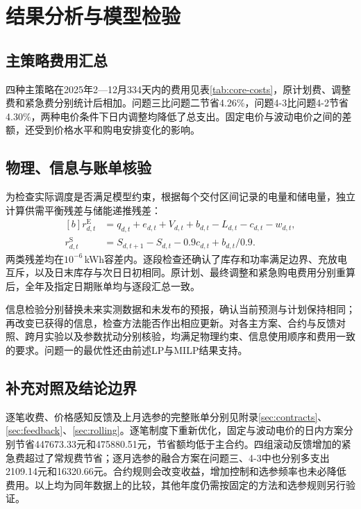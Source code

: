 \section{结果分析与模型检验}
\subsection{主策略费用汇总}
四种主策略在2025年2—12月334天内的费用见表\ref{tab:core-costs}，原计划费、调整费和紧急费分别统计后相加。问题三比问题二节省4.26\%，问题4-3比问题4-2节省4.30\%，两种电价条件下日内调整均降低了总支出。固定电价与波动电价之间的差额，还受到价格水平和购电安排变化的影响。

\FloatBarrier

\subsection{物理、信息与账单核验}
为检查实际调度是否满足模型约束，根据每个交付区间记录的电量和储电量，独立计算供需平衡残差与储能递推残差：
\begin{equation}
\begin{aligned}[b]
 r^{\mathrm E}_{d,t}&=q_{d,t}+e_{d,t}+V_{d,t}+b_{d,t}
                 -L_{d,t}-c_{d,t}-w_{d,t},\\
 r^{\mathrm S}_{d,t}&=S_{d,t+1}-S_{d,t}-0.9c_{d,t}+b_{d,t}/0.9.
\end{aligned}
\end{equation}
两类残差均在$10^{-6}$\,kWh容差内。逐段检查还确认了库存和功率满足边界、充放电互斥，以及日末库存与次日日初相同。原计划、最终调整和紧急购电费用分别重算后，全年及指定日期账单均与逐段汇总一致。

信息检验分别替换未来实测数据和未发布的预报，确认当前预测与计划保持相同；再改变已获得的信息，检查方法能否作出相应更新。对各主方案、合约与反馈对照、跨月实验以及参数扰动分别核验，均满足物理约束、信息使用顺序和费用一致的要求。问题一的最优性还由前述LP与MILP结果支持。

\subsection{补充对照及结论边界}
逐笔收费、价格感知反馈及上月选参的完整账单分别见附录\ref{sec:contracts}、\ref{sec:feedback}、\ref{sec:rolling}。逐笔制度下重新优化，固定与波动电价的日内方案分别节省447673.33元和475880.51元，节省额均低于主合约。四组滚动反馈增加的紧急费超过了常规费节省；逐月选参的融合方案在问题三、4-3中也分别多支出2109.14元和16320.66元。合约规则会改变收益，增加控制和选参频率也未必降低费用。以上均为同年数据上的比较，其他年度仍需按固定的方法和选参规则另行验证。
